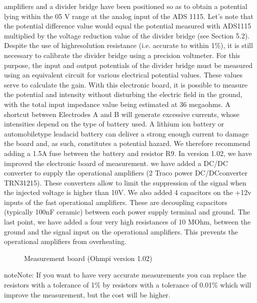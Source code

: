 \documentclass[letterpaper,10pt,english]{sphinxmanual}
\let\sphinxpxdimen\pdfpxdimen\else\newdimen\sphinxpxdimen
\begin{document}
amplifiers and a divider bridge have been positioned so as to obtain a potential lying within the 0\sphinxhyphen{}5 V range at the analog input of the ADS 1115.
Let’s note that the potential difference value would equal the potential measured with ADS1115 multiplied by the voltage reduction
value of the divider bridge (see Section 5.2). Despite the use of high\sphinxhyphen{}resolution resistance (i.e. accurate to within 1\%), it is
still necessary to calibrate the divider bridge using a precision voltmeter. For this purpose, the input and output potentials
of the divider bridge must be measured using an equivalent circuit for various electrical potential values. These values serve
to calculate the gain. With this electronic board, it is possible to measure the potential and intensity without disturbing the
electric field in the ground, with the total input impedance value being estimated at 36 mega\sphinxhyphen{}ohms.
A shortcut between Electrodes A and B will generate excessive currents, whose intensities depend on the type of battery used.
A lithium ion battery or automobile\sphinxhyphen{}type lead\sphinxhyphen{}acid battery can deliver a strong enough current to damage the board and, as such,
constitutes a potential hazard. We therefore recommend adding a 1.5\sphinxhyphen{}A fuse between the battery and resistor R9.
In version 1.02, we have improved the electronic board of measurement. we have added a DC/DC converter to supply the operational amplifiers
(2 Traco power DC/DCconverter TRN3\sphinxhyphen{}1215). These converters allow to limit the suppression of the signal when the injected voltage is higher than 10V.
We also added 4 capacitors on the +12v inputs of the fast operational amplifiers. These are decoupling capacitors (typically 100nF ceramic)
between each power supply terminal and ground. The last point, we have added a four very high resistances of 10 MOhm, between the ground and
the signal input on the operational amplifiers. This prevents the operational amplifiers from overheating.

\begin{figure}[htbp]
\centering
\capstart

\noindent\sphinxincludegraphics[width=800\sphinxpxdimen,height=400\sphinxpxdimen]{{schema_measurement_board1_02}.png}
\caption{Measurement board (Ohmpi version 1.02)}\label{\detokenize{V1_02:id1}}\end{figure}

\begin{sphinxadmonition}{note}{Note:}
\sphinxAtStartPar
If you want to have very accurate measurements you can replace the resistors with a tolerance of 1\% by resistors with a tolerance of 0.01\% which will improve the measurement, but the cost will be higher.
\end{sphinxadmonition}
\end{document}
